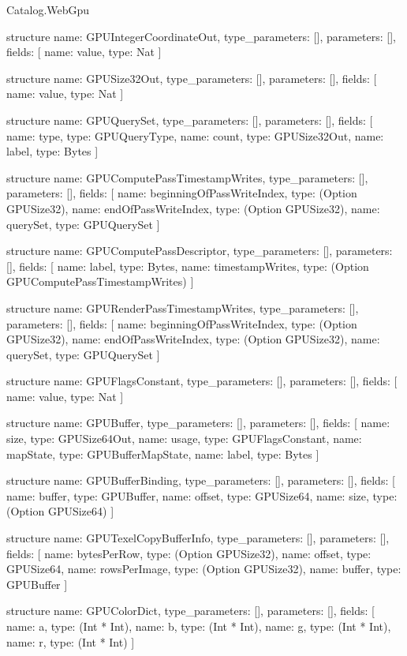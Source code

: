 \begin{lexlean}{Catalog.WebGpu}
\begin{semanticmodule}
structure{
  name: GPUIntegerCoordinateOut,
  type_parameters: [],
  parameters: [],
  fields: [
    {name: value, type: Nat}
  ]
}

structure{
  name: GPUSize32Out,
  type_parameters: [],
  parameters: [],
  fields: [
    {name: value, type: Nat}
  ]
}

structure{
  name: GPUQuerySet,
  type_parameters: [],
  parameters: [],
  fields: [
    {name: type, type: GPUQueryType},
    {name: count, type: GPUSize32Out},
    {name: label, type: Bytes}
  ]
}

structure{
  name: GPUComputePassTimestampWrites,
  type_parameters: [],
  parameters: [],
  fields: [
    {name: beginningOfPassWriteIndex, type: (Option GPUSize32)},
    {name: endOfPassWriteIndex, type: (Option GPUSize32)},
    {name: querySet, type: GPUQuerySet}
  ]
}

structure{
  name: GPUComputePassDescriptor,
  type_parameters: [],
  parameters: [],
  fields: [
    {name: label, type: Bytes},
    {name: timestampWrites, type: (Option GPUComputePassTimestampWrites)}
  ]
}

structure{
  name: GPURenderPassTimestampWrites,
  type_parameters: [],
  parameters: [],
  fields: [
    {name: beginningOfPassWriteIndex, type: (Option GPUSize32)},
    {name: endOfPassWriteIndex, type: (Option GPUSize32)},
    {name: querySet, type: GPUQuerySet}
  ]
}

structure{
  name: GPUFlagsConstant,
  type_parameters: [],
  parameters: [],
  fields: [
    {name: value, type: Nat}
  ]
}

structure{
  name: GPUBuffer,
  type_parameters: [],
  parameters: [],
  fields: [
    {name: size, type: GPUSize64Out},
    {name: usage, type: GPUFlagsConstant},
    {name: mapState, type: GPUBufferMapState},
    {name: label, type: Bytes}
  ]
}

structure{
  name: GPUBufferBinding,
  type_parameters: [],
  parameters: [],
  fields: [
    {name: buffer, type: GPUBuffer},
    {name: offset, type: GPUSize64},
    {name: size, type: (Option GPUSize64)}
  ]
}

structure{
  name: GPUTexelCopyBufferInfo,
  type_parameters: [],
  parameters: [],
  fields: [
    {name: bytesPerRow, type: (Option GPUSize32)},
    {name: offset, type: GPUSize64},
    {name: rowsPerImage, type: (Option GPUSize32)},
    {name: buffer, type: GPUBuffer}
  ]
}

structure{
  name: GPUColorDict,
  type_parameters: [],
  parameters: [],
  fields: [
    {name: a, type: (Int * Int)},
    {name: b, type: (Int * Int)},
    {name: g, type: (Int * Int)},
    {name: r, type: (Int * Int)}
  ]
}


\end{semanticmodule}
\end{lexlean}
